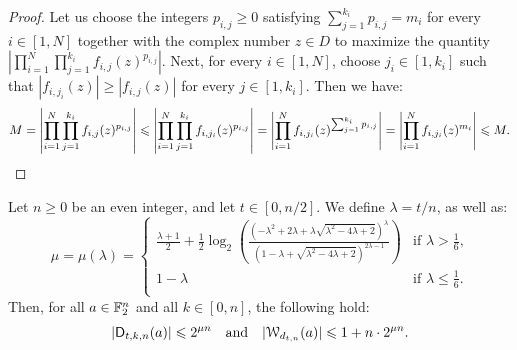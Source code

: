 \documentclass{llncs}
\begin{document}
\begin{proof}
    Let us choose the integers $p_{i,j}\geq 0$ satisfying $\sum_{j=1}^{k_i}p_{i,j}=m_i$ for every $i\in[1,N]$ together with the complex number $z\in D$ to maximize the quantity $\left|\prod_{i=1}^N\prod_{j=1}^{k_i}f_{i,j}(z)^{p_{i,j}}\right|$. Next, for every $i\in[1,N]$, choose $j_i\in[1,k_i]$ such that $|f_{i,j_i}(z)|\geq|f_{i,j}(z)|$ for every $j\in[1,k_i]$. Then we have:
    \[
        M=\left|\prod_{i=1}^N\prod_{j=1}^{k_i}f_{i,j}(z)^{p_{i,j}}\right|\leq\left|\prod_{i=1}^N\prod_{j=1}^{k_i}f_{i,j_i}(z)^{p_{i,j}}\right|=\left|\prod_{i=1}^Nf_{i,j_i}(z)^{\sum_{j=1}^{k_i}p_{i,j}}\right|=\left|\prod_{i=1}^Nf_{i,j_i}(z)^{m_i}\right|\leq M.\qedhere
    \]
\end{proof}

\begin{theorem}\label{theorem:bound_D_nka_generalized}
    Let $n\geq 0$ be an even integer, and let $t\in[0,n/2]$. We define $\lambda=t/n$, as well as:
    \[
        \mu=\mu(\lambda)=
        \begin{cases}
            \frac{\lambda+1}{2}+\frac12\log_2\left(\frac{\left(-\lambda^2+2\lambda+\lambda\sqrt{\lambda^2-4\lambda+2}\right)^\lambda}{\left(1-\lambda+\sqrt{\lambda^2-4\lambda+2}\right)^{2\lambda-1}}\right)&\text{if $\lambda>\frac 16$,}\\
            1-\lambda&\text{if $\lambda\leq\frac 16$.}\\
        \end{cases}
    \]
    Then, for all $a\in\F_2^n$ and all $k\in[0,n]$, the following hold:
    \[
        |\Dtkna tkna|\leq 2^{\mu n}\quad \text{and} \quad  |\wt{d_{t,n}}(a)|\leq 1+n\cdot 2^{\mu n}.
    \]
\end{theorem}
\end{document}
